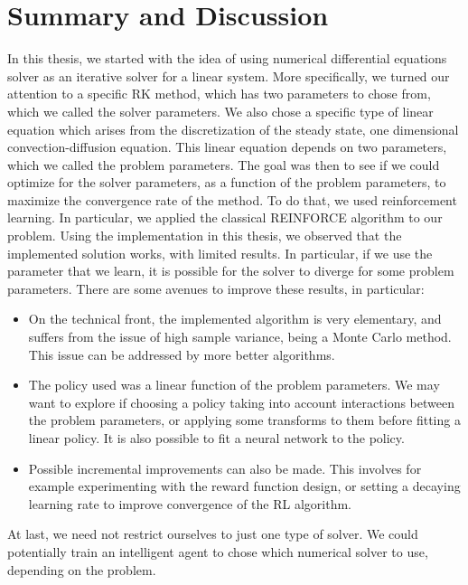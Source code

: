 \documentclass[
  letterpaper,
]{report}
\providecommand{\tightlist}{%
  \setlength{\itemsep}{0pt}\setlength{\parskip}{0pt}}\usepackage{longtable,booktabs,array}
\theoremstyle{definition}
\theoremstyle{plain}
\theoremstyle{definition}
\theoremstyle{remark}
\begin{document}

\chapter{Summary and Discussion}\label{summary-and-discussion}

In this thesis, we started with the idea of using numerical differential
equations solver as an iterative solver for a linear system. More
specifically, we turned our attention to a specific RK method, which has
two parameters to chose from, which we called the solver parameters. We
also chose a specific type of linear equation which arises from the
discretization of the steady state, one dimensional convection-diffusion
equation. This linear equation depends on two parameters, which we
called the problem parameters. The goal was then to see if we could
optimize for the solver parameters, as a function of the problem
parameters, to maximize the convergence rate of the method. To do that,
we used reinforcement learning. In particular, we applied the classical
REINFORCE algorithm to our problem. Using the implementation in this
thesis, we observed that the implemented solution works, with limited
results. In particular, if we use the parameter that we learn, it is
possible for the solver to diverge for some problem parameters. There
are some avenues to improve these results, in particular:

\begin{itemize}
\tightlist
\item
  On the technical front, the implemented algorithm is very elementary,
  and suffers from the issue of high sample variance, being a Monte
  Carlo method. This issue can be addressed by more better algorithms.
\item
  The policy used was a linear function of the problem parameters. We
  may want to explore if choosing a policy taking into account
  interactions between the problem parameters, or applying some
  transforms to them before fitting a linear policy. It is also possible
  to fit a neural network to the policy.
\item
  Possible incremental improvements can also be made. This involves for
  example experimenting with the reward function design, or setting a
  decaying learning rate to improve convergence of the RL algorithm.
\end{itemize}

At last, we need not restrict ourselves to just one type of solver. We
could potentially train an intelligent agent to chose which numerical
solver to use, depending on the problem.
\end{document}
